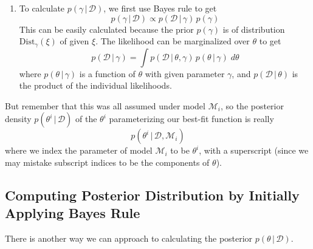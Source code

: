 \documentclass{article}
\begin{document}
\begin{enumerate}
      \item To calculate $p(\gamma\,|\,\mathcal{D})$, we first use Bayes rule to get
      \begin{equation}
        p(\gamma\,|\,\mathcal{D}) \propto p(\mathcal{D}\,|\,\gamma)\, p(\gamma)
      \end{equation}
      This can be easily calculated because the prior $p(\gamma)$ is of distribution $\text{Dist}_\gamma (\xi)$ of given $\xi$. The likelihood can be marginalized over $\theta$ to get
      \begin{equation}
        p(\mathcal{D}\,|\,\gamma) = \int p(\mathcal{D}\,|\,\theta, \gamma)\, p(\theta\,|\, \gamma)\; d\theta
      \end{equation}
      where $p(\theta\,|\,\gamma)$ is a function of $\theta$ with given parameter $\gamma$, and $p(\mathcal{D}\,|\,\theta)$ is the product of the individual likelihoods.
    \end{enumerate}

    But remember that this was all assumed under model $\mathcal{M}_i$, so the posterior density $p(\theta^i \,|\,\mathcal{D})$ of the $\theta^i$ parameterizing our best-fit function is really
    \begin{equation}
      p(\theta^i \,|\,\mathcal{D}, \mathcal{M}_i)
    \end{equation}
    where we index the parameter of model $\mathcal{M}_i$ to be $\theta^i$, with a superscript (since we may mistake subscript indices to be the components of $\theta$).

  \subsection{Computing Posterior Distribution by Initially Applying Bayes Rule}

    There is another way we can approach to calculating the posterior $p(\theta\,|\,\mathcal{D})$.
\end{document}

